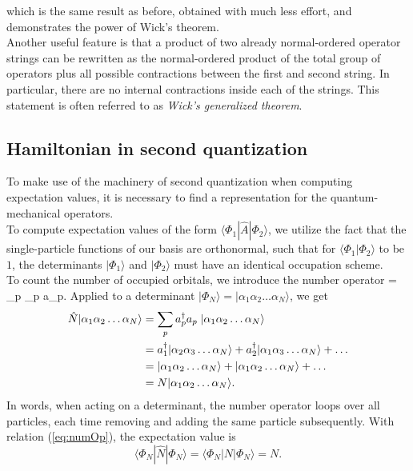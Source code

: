 which is the same result as before, obtained with much less effort, and demonstrates the power of Wick's theorem.\\
Another useful feature is that a product of two already normal-ordered operator strings can be rewritten as the normal-ordered product of the total group of operators plus all possible contractions between the first and second string. In particular, there are no internal contractions inside each of the strings. This statement is often referred to as \textit{Wick's generalized theorem}.


\subsection{Hamiltonian in second quantization}
To make use of the machinery of second quantization when computing expectation values, it is necessary to find a representation for the quantum-mechanical operators.\\
To compute expectation values of the form $\langle \Phi_1 | \hat{A} | \Phi_2 \rangle$, we utilize the fact that the 
single-particle functions of our basis are orthonormal, such that for $\langle \Phi_1 | \Phi_2\rangle$ to be $1 $, the determinants  $|\Phi_1\rangle$ and $|\Phi_2\rangle$ must have an identical occupation scheme. \\
 To count the  number of occupied orbitals, we introduce the number operator
\be 
{} = \sum_p \ad_p a_p.
\ee 
Applied to a determinant $|\Phi_N\rangle = |\alpha_1 \alpha_2 \dots \alpha_N\rangle$, we get
\begin{align}
\hat{N} |\alpha_1 \alpha_2 \dots \alpha_N\rangle &= \sum_p \ad_p a_p \;|\alpha_1 \alpha_2 \dots \alpha_N\rangle \notag \\
&= \ad_1 |\alpha_2 \alpha_3 \dots \alpha_N\rangle + \ad_2 |\alpha_1 \alpha_3 \dots \alpha_N\rangle + \dots \notag \\
&= |\alpha_1 \alpha_2 \dots \alpha_N\rangle + |\alpha_1 \alpha_2 \dots \alpha_N\rangle + \dots \notag \\
&= N |\alpha_1 \alpha_2 \dots \alpha_N\rangle.
\label{eq:numOp}
\end{align}
In words, when acting on a determinant, the number operator loops over all particles, each time removing and adding the same particle subsequently. With relation (\ref{eq:numOp}),  the expectation value is 
\[
\langle \Phi_N |\hat{N} |\Phi_N \rangle  = \langle \Phi_N |N |\Phi_N \rangle = N.
\]

